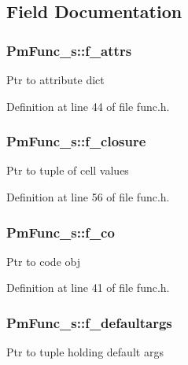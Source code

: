 \subsection{Field Documentation}
\hypertarget{struct_pm_func__s_ad750c0d34765082f78e76b61d1c14e6b}{
\subsubsection[{f\-\_\-attrs}]{ Pm\-Func\-\_\-s\-::f\-\_\-attrs}}\label{struct_pm_func__s_ad750c0d34765082f78e76b61d1c14e6b}
Ptr to attribute dict 

Definition at line 44 of file func.\-h.

\hypertarget{struct_pm_func__s_ae5f8e8fc29f24733a8c63b049eee979f}{
\subsubsection[{f\-\_\-closure}]{ Pm\-Func\-\_\-s\-::f\-\_\-closure}}\label{struct_pm_func__s_ae5f8e8fc29f24733a8c63b049eee979f}
Ptr to tuple of cell values 

Definition at line 56 of file func.\-h.

\hypertarget{struct_pm_func__s_ac855d820839ccafcd72e20287e228cca}{
\subsubsection[{f\-\_\-co}]{ Pm\-Func\-\_\-s\-::f\-\_\-co}}\label{struct_pm_func__s_ac855d820839ccafcd72e20287e228cca}
Ptr to code obj 

Definition at line 41 of file func.\-h.

\hypertarget{struct_pm_func__s_a503ed74d4cd90a90cb36b18cacf8c908}{
\subsubsection[{f\-\_\-defaultargs}]{ Pm\-Func\-\_\-s\-::f\-\_\-defaultargs}}\label{struct_pm_func__s_a503ed74d4cd90a90cb36b18cacf8c908}
Ptr to tuple holding default args 

